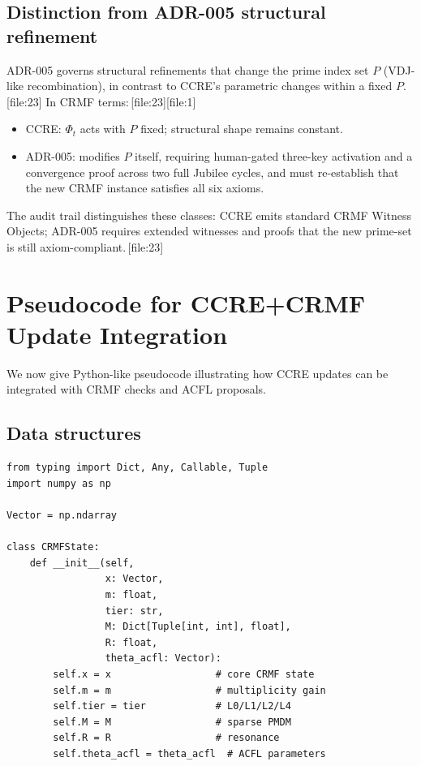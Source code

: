 \documentclass[11pt]{article}
\begin{document}
\subsection{Distinction from ADR-005 structural refinement}

ADR-005 governs structural refinements that change the prime index set $P$ (VDJ-like recombination), in contrast to CCRE's parametric changes within a fixed $P$.\,[file:23]
In CRMF terms:\,[file:23][file:1]
\begin{itemize}[leftmargin=1.5em]
  \item CCRE: $\Phi_t$ acts with $P$ fixed; structural shape remains constant.
  \item ADR-005: modifies $P$ itself, requiring human-gated three-key activation and a convergence proof across two full Jubilee cycles, and must re-establish that the new CRMF instance satisfies all six axioms.
\end{itemize}
The audit trail distinguishes these classes: CCRE emits standard CRMF Witness Objects; ADR-005 requires extended witnesses and proofs that the new prime-set is still axiom-compliant.\,[file:23]

\section{Pseudocode for CCRE+CRMF Update Integration}

We now give Python-like pseudocode illustrating how CCRE updates can be integrated with CRMF checks and ACFL proposals.

\subsection{Data structures}

\begin{verbatim}
from typing import Dict, Any, Callable, Tuple
import numpy as np

Vector = np.ndarray

class CRMFState:
    def __init__(self,
                 x: Vector,
                 m: float,
                 tier: str,
                 M: Dict[Tuple[int, int], float],
                 R: float,
                 theta_acfl: Vector):
        self.x = x                  # core CRMF state
        self.m = m                  # multiplicity gain
        self.tier = tier            # L0/L1/L2/L4
        self.M = M                  # sparse PMDM
        self.R = R                  # resonance
        self.theta_acfl = theta_acfl  # ACFL parameters
\end{verbatim}
\end{document}
